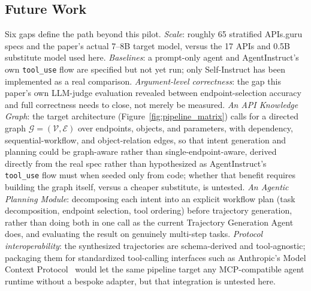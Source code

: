 \documentclass[11pt]{article}
\begin{document}
\subsection{Future Work}
Six gaps define the path beyond this pilot. \textit{Scale}: roughly 65 stratified APIs.guru
specs and the paper's actual 7--8B target model, versus the 17 APIs and 0.5B substitute model
used here. \textit{Baselines}: a prompt-only agent and AgentInstruct's own \texttt{tool\_use} flow
are specified but not yet run; only Self-Instruct has been implemented as a real comparison.
\textit{Argument-level correctness}: the gap this paper's own LLM-judge evaluation revealed
between endpoint-selection accuracy and full correctness needs to close, not merely be measured.
\textit{An API Knowledge Graph}: the target architecture (Figure~\ref{fig:pipeline_matrix}) calls
for a directed graph $\mathcal{G} = (\mathcal{V}, \mathcal{E})$ over endpoints, objects, and
parameters, with dependency, sequential-workflow, and object-relation edges, so that intent
generation and planning could be graph-aware rather than single-endpoint-aware, derived directly
from the real spec rather than hypothesized as AgentInstruct's~\cite{mitra2024agentinstruct}
\texttt{tool\_use} flow must when seeded only from code; whether that benefit requires building
the graph itself, versus a cheaper substitute, is untested. \textit{An Agentic Planning Module}:
decomposing each intent into an explicit workflow plan (task decomposition, endpoint selection,
tool ordering) before trajectory generation, rather than doing both in one call as the current
Trajectory Generation Agent does, and evaluating the result on genuinely multi-step tasks.
\textit{Protocol interoperability}: the synthesized trajectories are schema-derived and
tool-agnostic; packaging them for standardized tool-calling interfaces such as Anthropic's Model
Context Protocol~\cite{anthropic2024mcp} would let the same pipeline target any MCP-compatible
agent runtime without a bespoke adapter, but that integration is untested here.



\end{document}
